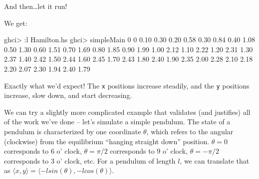 \documentclass[]{article}
\newenvironment{Shaded}{}{}
\newcommand{\CommentTok}[1]{\textcolor[rgb]{0.38,0.63,0.69}{\textit{#1}}}
\newcommand{\DataTypeTok}[1]{\textcolor[rgb]{0.56,0.13,0.00}{#1}}
\newcommand{\DecValTok}[1]{\textcolor[rgb]{0.25,0.63,0.44}{#1}}
\newcommand{\FloatTok}[1]{\textcolor[rgb]{0.25,0.63,0.44}{#1}}
\newcommand{\FunctionTok}[1]{\textcolor[rgb]{0.02,0.16,0.49}{#1}}
\newcommand{\NormalTok}[1]{#1}
\newcommand{\OperatorTok}[1]{\textcolor[rgb]{0.40,0.40,0.40}{#1}}
\newcommand{\OtherTok}[1]{\textcolor[rgb]{0.00,0.44,0.13}{#1}}
\begin{document}
And then\ldots let it run!

\begin{Shaded}
\end{Shaded}

We get:

\begin{Shaded}
\begin{Highlighting}[]
\NormalTok{ghci}\OperatorTok{>} \OperatorTok{:}\NormalTok{l Hamilton.hs}
\NormalTok{ghci}\OperatorTok{>}\NormalTok{ simpleMain}
\DecValTok{0}     \DecValTok{0}
\FloatTok{0.10}  \FloatTok{0.30}
\FloatTok{0.20}  \FloatTok{0.58}
\FloatTok{0.30}  \FloatTok{0.84}
\FloatTok{0.40}  \FloatTok{1.08}
\FloatTok{0.50}  \FloatTok{1.30}
\FloatTok{0.60}  \FloatTok{1.51}
\FloatTok{0.70}  \FloatTok{1.69}
\FloatTok{0.80}  \FloatTok{1.85}
\FloatTok{0.90}  \FloatTok{1.99}
\FloatTok{1.00}  \FloatTok{2.12}
\FloatTok{1.10}  \FloatTok{2.22}
\FloatTok{1.20}  \FloatTok{2.31}
\FloatTok{1.30}  \FloatTok{2.37}
\FloatTok{1.40}  \FloatTok{2.42}
\FloatTok{1.50}  \FloatTok{2.44}
\FloatTok{1.60}  \FloatTok{2.45}
\FloatTok{1.70}  \FloatTok{2.43}
\FloatTok{1.80}  \FloatTok{2.40}
\FloatTok{1.90}  \FloatTok{2.35}
\FloatTok{2.00}  \FloatTok{2.28}
\FloatTok{2.10}  \FloatTok{2.18}
\FloatTok{2.20}  \FloatTok{2.07}
\FloatTok{2.30}  \FloatTok{1.94}
\FloatTok{2.40}  \FloatTok{1.79}
\end{Highlighting}
\end{Shaded}

Exactly what we'd expect! The \texttt{x} positions increase steadily, and the
\texttt{y} positions increase, slow down, and start decreasing.

We can try a slightly more complicated example that validates (and justifies)
all of the work we've done -- let's simulate a simple pendulum. The state of a
pendulum is characterized by one coordinate \(\theta\), which refers to the
angular (clockwise) from the equilibrium ``hanging straight down'' position.
\(\theta = 0\) corresponds to 6 o' clock, \(\theta = \pi/2\) corresponds to 9 o'
clock, \(\theta = - \pi / 2\) corresponds to 3 o' clock, etc. For a pendulum of
length \(l\), we can translate that as
\(\langle x, y \rangle = \langle - l sin(\theta), - l cos(\theta) \rangle\).
\end{document}
